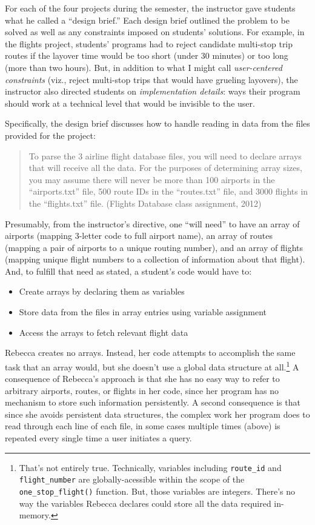 For each of the four projects during the semester, the instructor gave students what he called a ``design brief.'' Each design brief outlined the problem to be solved as well as any constraints imposed on students' solutions. For example, in the flights project, students' programs had to reject candidate multi-stop trip routes if the layover time would be too short (under 30 minutes) or too long (more than two hours). But, in addition to what I might call \emph{user-centered constraints} (viz., reject multi-stop trips that would have grueling layovers), the instructor also directed students on \emph{implementation details}: ways their program should work at a technical level that would be invisible to the user.

Specifically, the design brief discusses how to handle reading in data from the files provided for the project:

\begin{quote}
To parse the 3 airline flight database files, you will need to declare arrays that will receive all the data. For the purposes of determining array sizes, you may assume there will never be more than 100 airports in the ``airports.txt'' file, 500 route IDs in the ``routes.txt'' file, and 3000 flights in the ``flights.txt'' file. (Flights Database class assignment, 2012)
\end{quote}

Presumably, from the instructor's directive, one ``will need'' to have an array of airports (mapping 3-letter code to full airport name), an array of routes (mapping a pair of airports to a unique routing number), and an array of flights (mapping unique flight numbers to a collection of information about that flight). And, to fulfill that need as stated, a student's code would have to:

\begin{itemize}
\tightlist
\item
  Create arrays by declaring them as variables
\item
  Store data from the files in array entries using variable assignment
\item
  Access the arrays to fetch relevant flight data
\end{itemize}

Rebecca creates no arrays. Instead, her code attempts to accomplish the same task that an array would, but she doesn't use a global data structure at all.\footnote{That's not entirely true. Technically, variables including \texttt{route\_id} and \texttt{flight\_number} are globally-acessible within the scope of the \texttt{one\_stop\_flight()} function. But, those variables are integers. There's no way the variables Rebecca declares could store all the data required in-memory.} A consequence of Rebecca's approach is that she has no easy way to refer to arbitrary airports, routes, or flights in her code, since her program has no mechanism to store such information persistently. A second consequence is that since she avoids persistent data structures, the complex work her program does to read through each line of each file, in some cases multiple times (above) is repeated every single time a user initiates a query.

